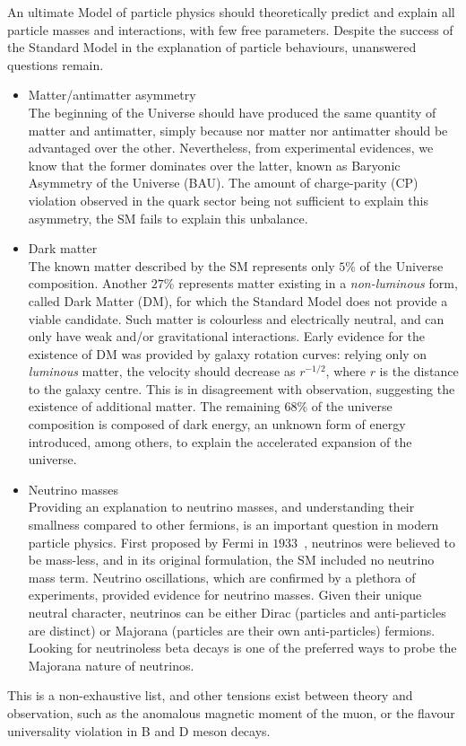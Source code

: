 An ultimate Model of particle physics should theoretically predict and explain all particle masses and interactions, with few free parameters.
Despite the success of the Standard Model in the explanation of particle behaviours, unanswered questions remain.
\begin{itemize}
\item Matter/antimatter asymmetry\\
  The beginning of the Universe should have produced the same quantity of matter and antimatter, simply because nor matter nor antimatter should be advantaged over the other.
  Nevertheless, from experimental evidences, we know that the former dominates over the latter, known as Baryonic Asymmetry of the Universe (BAU).
  The amount of charge-parity (CP) violation observed in the quark sector being not sufficient to explain this asymmetry, the SM fails to explain this unbalance.
\item Dark matter\\
  The known matter described by the SM represents only $5$\% of the Universe composition.
  Another $27$\% represents matter existing in a \emph{non-luminous} form, called Dark Matter (DM), for which the Standard Model does not provide a viable candidate.
  Such matter is colourless and electrically neutral, and can only have weak and/or gravitational interactions.
  Early evidence for the existence of DM was provided by galaxy rotation curves: relying only on \emph{luminous} matter, the velocity should decrease as $r^{-1/2}$, where $r$ is the distance to the galaxy centre.
  This is in disagreement with observation, suggesting the existence of additional matter.
  The remaining $68$\% of the universe composition is composed of dark energy, an unknown form of energy introduced, among others, to explain the accelerated expansion of the universe.
\item Neutrino masses\\
  Providing an explanation to neutrino masses, and understanding their smallness compared to other fermions, is an important question in modern particle physics.
  First proposed by Fermi in $1933$~\cite{art:fermi_1933}, neutrinos were believed to be mass-less, and in its original formulation, the SM included no neutrino mass term.
  Neutrino oscillations, which are confirmed by a plethora of experiments, provided evidence for neutrino masses.
  Given their unique neutral character, neutrinos can be either Dirac (particles and anti-particles are distinct) or Majorana (particles are their own anti-particles) fermions.
  Looking for neutrinoless beta decays is one of the preferred ways to probe the Majorana nature of neutrinos.
\end{itemize}
This is a non-exhaustive list, and other tensions exist between theory and observation, such as the anomalous magnetic moment of the muon, or the flavour universality violation in B and D meson decays.


